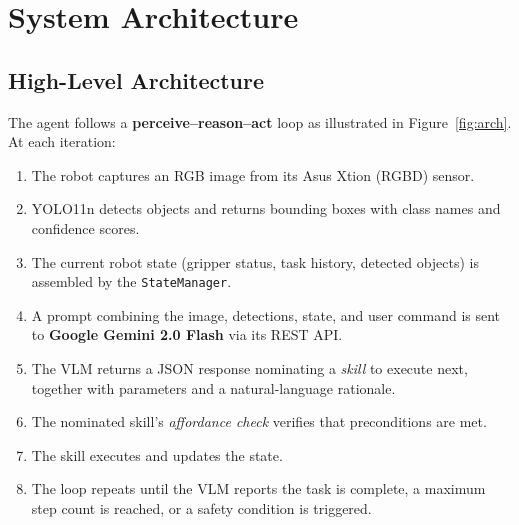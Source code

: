 \documentclass[12pt,a4paper]{report}
\begin{document}
\chapter{System Architecture}

\section{High-Level Architecture}

The agent follows a \textbf{perceive–reason–act} loop as illustrated in
Figure~\ref{fig:arch}.  At each iteration:

\begin{enumerate}
  \item The robot captures an RGB image from its Asus Xtion (RGBD) sensor.
  \item YOLO11n detects objects and returns bounding boxes with class names and
        confidence scores.
  \item The current robot state (gripper status, task history, detected objects) is
        assembled by the \texttt{StateManager}.
  \item A prompt combining the image, detections, state, and user command is sent to
        \textbf{Google Gemini 2.0 Flash} via its REST API.
  \item The VLM returns a JSON response nominating a \emph{skill} to execute next,
        together with parameters and a natural-language rationale.
  \item The nominated skill's \emph{affordance check} verifies that preconditions are met.
  \item The skill executes and updates the state.
  \item The loop repeats until the VLM reports the task is complete, a maximum step
        count is reached, or a safety condition is triggered.
\end{enumerate}
\end{document}

